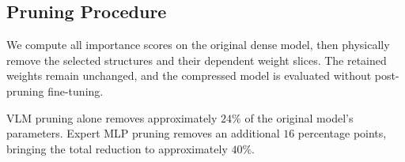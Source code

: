 \subsection{Pruning Procedure}
\label{sec:pruning_procedure}

We compute all importance scores on the original dense model,
then physically remove the selected structures and their dependent
weight slices. The retained weights remain unchanged, and the
compressed model is evaluated without post-pruning fine-tuning.

VLM pruning alone removes approximately $24\%$ of the original
model's parameters. Expert MLP pruning removes an additional
$16$ percentage points, bringing the total reduction to
approximately $40\%$.

